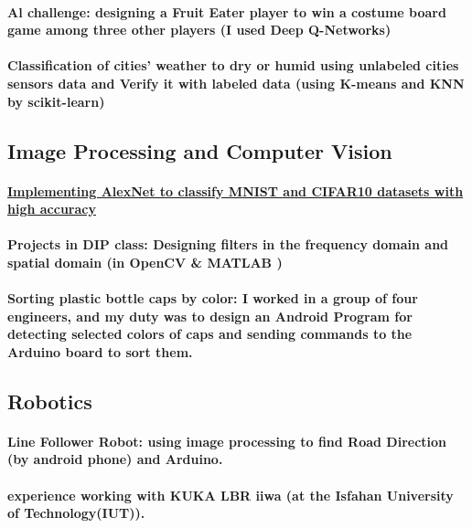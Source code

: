 \documentclass[a4paper]{article}
\begin{document}
            \paragraph{Al challenge: designing a Fruit Eater player to win a costume board game among three other players (I used Deep Q-Networks)}
            \paragraph{Classification of cities' weather to dry or humid using unlabeled cities sensors data and Verify it with labeled data (using K-means and KNN by scikit-learn)}

        \subsection{Image Processing and Computer Vision}

            \paragraph{\href{https://github.com/ake1999/CNN_AlexNet}{Implementing  AlexNet to classify MNIST and CIFAR10 datasets with high accuracy}}
            \paragraph{Projects in DIP class: Designing filters in the frequency domain and spatial domain (in OpenCV \& MATLAB )}
            \paragraph{Sorting plastic bottle caps by color: I worked in a group of four engineers, and my duty was to design an Android Program for detecting selected colors of caps and sending commands to the Arduino board to sort them.}

        \subsection{Robotics}

            \paragraph{Line Follower Robot: using image processing to find Road Direction (by android phone) and Arduino.}
            \paragraph{experience working with KUKA LBR iiwa (at the Isfahan University of Technology(IUT)).}
\end{document}

